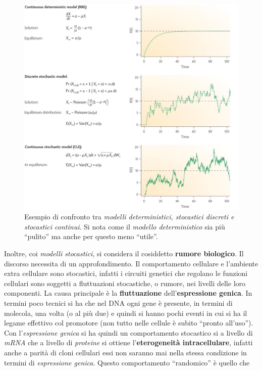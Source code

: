 \documentclass[a4paper,12pt, oneside]{book}
\begin{document}
\begin{figure}
  \centering
  \includegraphics[width = \textwidth]{img/stocdet.jpg}
  \caption{Esempio di confronto tra \textit{modelli deterministici, stocastici
      discreti e stocastici continui}. Si nota come il \textit{modello
      deterministico} sia più ``pulito'' ma anche per questo meno ``utile''.} 
  \label{fig:stocdet}
\end{figure}
Inoltre, coi \textit{modelli stocastici}, si considera il cosiddetto
\textbf{rumore biologico}. Il discorso necessita di un approfondimento. Il
comportamento cellulare e l'ambiente extra cellulare sono stocastici, infatti i
circuiti genetici che regolano le funzioni cellulari sono soggetti a
fluttuazioni stocastiche, o rumore, nei livelli delle loro componenti. La causa
principale è la \textbf{fluttuazione} dell'\textbf{espressione genica}. In
termini poco tecnici si ha che nel DNA ogni gene è presente, in termini di
molecola, una volta (o al più due) e quindi si 
hanno pochi eventi in cui si ha il legame effettivo col promotore (non tutto
nelle cellule è subito ``pronto all'uso''). Con
l'\textit{espressione genica} si ha quindi un comportamento stocastico si a
livello di \textit{mRNA} che a livello di \textit{proteine} si ottiene
l'\textbf{eterogeneità intracellulare}, infatti anche a parità di cloni
cellulari essi non saranno mai nella stessa condizione in termini di
\textit{espressione genica}. Questo comportamento ``randomico'' è quello che
\end{document}
